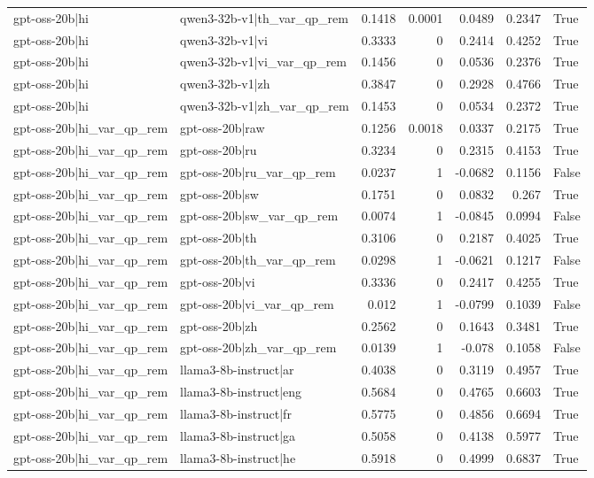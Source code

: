 \begin{table}
\begin{tabular}{l l r r r r l}
gpt-oss-20b|hi & qwen3-32b-v1|th_var_qp_rem & 0.1418 & 0.0001 & 0.0489 & 0.2347 & True \\
gpt-oss-20b|hi & qwen3-32b-v1|vi & 0.3333 & 0 & 0.2414 & 0.4252 & True \\
gpt-oss-20b|hi & qwen3-32b-v1|vi_var_qp_rem & 0.1456 & 0 & 0.0536 & 0.2376 & True \\
gpt-oss-20b|hi & qwen3-32b-v1|zh & 0.3847 & 0 & 0.2928 & 0.4766 & True \\
gpt-oss-20b|hi & qwen3-32b-v1|zh_var_qp_rem & 0.1453 & 0 & 0.0534 & 0.2372 & True \\
gpt-oss-20b|hi_var_qp_rem & gpt-oss-20b|raw & 0.1256 & 0.0018 & 0.0337 & 0.2175 & True \\
gpt-oss-20b|hi_var_qp_rem & gpt-oss-20b|ru & 0.3234 & 0 & 0.2315 & 0.4153 & True \\
gpt-oss-20b|hi_var_qp_rem & gpt-oss-20b|ru_var_qp_rem & 0.0237 & 1 & -0.0682 & 0.1156 & False \\
gpt-oss-20b|hi_var_qp_rem & gpt-oss-20b|sw & 0.1751 & 0 & 0.0832 & 0.267 & True \\
gpt-oss-20b|hi_var_qp_rem & gpt-oss-20b|sw_var_qp_rem & 0.0074 & 1 & -0.0845 & 0.0994 & False \\
gpt-oss-20b|hi_var_qp_rem & gpt-oss-20b|th & 0.3106 & 0 & 0.2187 & 0.4025 & True \\
gpt-oss-20b|hi_var_qp_rem & gpt-oss-20b|th_var_qp_rem & 0.0298 & 1 & -0.0621 & 0.1217 & False \\
gpt-oss-20b|hi_var_qp_rem & gpt-oss-20b|vi & 0.3336 & 0 & 0.2417 & 0.4255 & True \\
gpt-oss-20b|hi_var_qp_rem & gpt-oss-20b|vi_var_qp_rem & 0.012 & 1 & -0.0799 & 0.1039 & False \\
gpt-oss-20b|hi_var_qp_rem & gpt-oss-20b|zh & 0.2562 & 0 & 0.1643 & 0.3481 & True \\
gpt-oss-20b|hi_var_qp_rem & gpt-oss-20b|zh_var_qp_rem & 0.0139 & 1 & -0.078 & 0.1058 & False \\
gpt-oss-20b|hi_var_qp_rem & llama3-8b-instruct|ar & 0.4038 & 0 & 0.3119 & 0.4957 & True \\
gpt-oss-20b|hi_var_qp_rem & llama3-8b-instruct|eng & 0.5684 & 0 & 0.4765 & 0.6603 & True \\
gpt-oss-20b|hi_var_qp_rem & llama3-8b-instruct|fr & 0.5775 & 0 & 0.4856 & 0.6694 & True \\
gpt-oss-20b|hi_var_qp_rem & llama3-8b-instruct|ga & 0.5058 & 0 & 0.4138 & 0.5977 & True \\
gpt-oss-20b|hi_var_qp_rem & llama3-8b-instruct|he & 0.5918 & 0 & 0.4999 & 0.6837 & True \\

\end{tabular}
\end{table}
